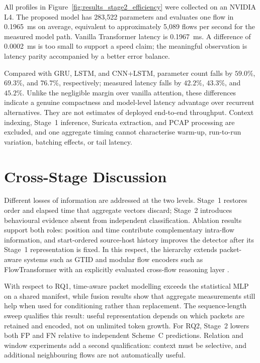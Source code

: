 \documentclass[11pt,fleqn]{report}
\begin{document}
All profiles in Figure~\ref{fig:results_stage2_efficiency} were collected on an NVIDIA L4. The proposed model has 283,522 parameters and evaluates one flow in 0.1965~ms on average, equivalent to approximately 5,089 flows per second for the measured model path. Vanilla Transformer latency is 0.1967~ms. A difference of 0.0002~ms is too small to support a speed claim; the meaningful observation is latency parity accompanied by a better error balance.

Compared with GRU, LSTM, and CNN+LSTM, parameter count falls by $59.0\%$, $69.3\%$, and $76.7\%$, respectively; measured latency falls by $42.2\%$, $43.3\%$, and $45.2\%$. Unlike the negligible margin over vanilla attention, these differences indicate a genuine compactness and model-level latency advantage over recurrent alternatives. They are not estimates of deployed end-to-end throughput. Context indexing, Stage~1 inference, Suricata extraction, and PCAP processing are excluded, and one aggregate timing cannot characterise warm-up, run-to-run variation, batching effects, or tail latency.

\section{Cross-Stage Discussion}
\label{subsec:results_cross_stage_discussion}

Different losses of information are addressed at the two levels. Stage~1 restores order and elapsed time that aggregate vectors discard; Stage~2 introduces behavioural evidence absent from independent classification. Ablation results support both roles: position and time contribute complementary intra-flow information, and start-ordered source-host history improves the detector after its Stage~1 representation is fixed. In this respect, the hierarchy extends packet-aware systems such as GTID and modular flow encoders such as FlowTransformer with an explicitly evaluated cross-flow reasoning layer \cite{Han2023GTID,Manocchio2024FlowTransformer}.

With respect to RQ1, time-aware packet modelling exceeds the statistical MLP on a shared manifest, while fusion results show that aggregate measurements still help when used for conditioning rather than replacement. The sequence-length sweep qualifies this result: useful representation depends on which packets are retained and encoded, not on unlimited token growth. For RQ2, Stage~2 lowers both FP and FN relative to independent Scheme~C predictions. Relation and window experiments add a second qualification: context must be selective, and additional neighbouring flows are not automatically useful.
\end{document}
